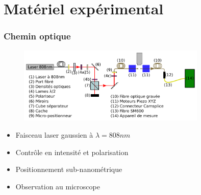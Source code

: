 \documentclass[9pt,a9paper,handout]{beamer}
\begin{document}
\section{Matériel expérimental}
    \begin{frame}
        \frametitle{Chemin optique}
        \begin{figure}\centering
            \includegraphics[width=0.8\textwidth]{Images/Schemas/experience}
        \end{figure}
        \begin{itemize}
            \item Faisceau laser gaussien à $\lambda = 808nm$
            \item Contrôle en intensité et polarisation
            \item Positionnement sub-nanométrique
            \item Observation au microscope
        \end{itemize}
    \end{frame}
\end{document}
